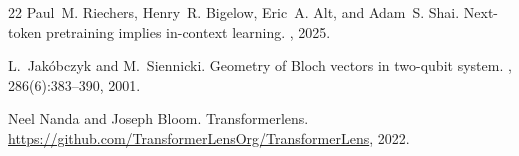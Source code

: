 \documentclass[prx,nofootinbib,onecolumn,showkeys,groupaddress,preprintnumbers,floatfix,
superscriptaddress]{revtex4-1}
\begin{document}
\begin{thebibliography}{22}
Paul~M. Riechers, Henry~R. Bigelow, Eric~A. Alt, and Adam~S. Shai.
\newblock Next-token pretraining implies in-context learning.
, 2025.

L.~Jak{\'o}bczyk and M.~Siennicki.
\newblock Geometry of {B}loch vectors in two-qubit system.
, 286(6):383--390, 2001.

Neel Nanda and Joseph Bloom.
\newblock Transformerlens.
\newblock \url{https://github.com/TransformerLensOrg/TransformerLens}, 2022.
	
\end{thebibliography}
\end{document}
